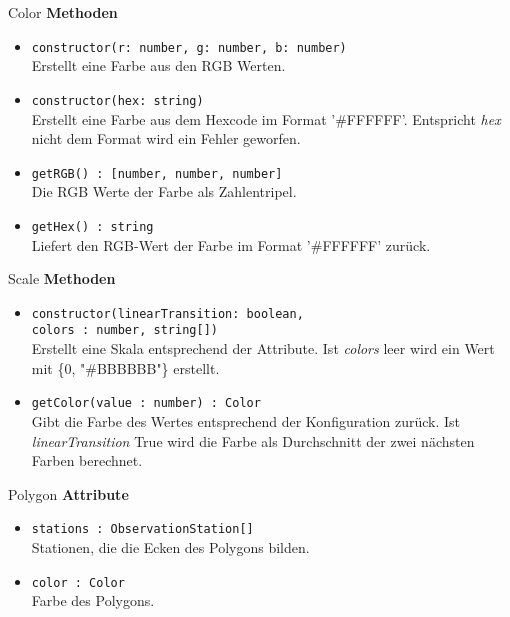     \begin{Class}{Color}
        \textbf{Methoden}
        \begin{itemize}
            \item \texttt{constructor(r: number, g: number, b: number)}
            \\ Erstellt eine Farbe aus den RGB Werten.
            \item \texttt{constructor(hex: string)}
            \\ Erstellt eine Farbe aus dem Hexcode im Format '\#FFFFFF'.
            Entspricht \emph{hex} nicht dem Format wird ein Fehler geworfen.
            \item \texttt{getRGB() : [number, number, number]}
            \\ Die RGB Werte der Farbe als Zahlentripel.
            \item \texttt{getHex() : string}
            \\ Liefert den RGB-Wert der Farbe im Format '\#FFFFFF' zurück.
        \end{itemize}
    \end{Class}

    \begin{Class}{Scale}
        \textbf{Methoden}
        \begin{itemize}
            \item \texttt{constructor(linearTransition: boolean,
            \\colors : {number, string}[])}
            \\ Erstellt eine Skala entsprechend der Attribute.
            Ist \emph{colors} leer wird ein Wert mit \{0, "\#BBBBBB"\} erstellt.
            \item \texttt{getColor(value : number) : Color}
            \\ Gibt die Farbe des Wertes entsprechend der Konfiguration zurück.
            Ist \emph{linearTransition} True wird die Farbe als Durchschnitt der zwei nächsten Farben berechnet.
        \end{itemize}
    \end{Class}

    \begin{Class}{Polygon}
        \textbf{Attribute}
        \begin{itemize}
            \item \texttt{stations : ObservationStation[]}
            \\ Stationen, die die Ecken des Polygons bilden.
            \item \texttt{color : Color}
            \\ Farbe des Polygons.
        \end{itemize}
    \end{Class}

